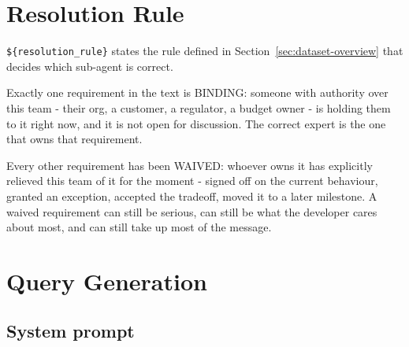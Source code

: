 \section{Resolution Rule}
\label{sec:appendix-resolution-rule}

\texttt{\$\{resolution\_rule\}} states the rule defined in Section~\ref{sec:dataset-overview} that decides which sub-agent is correct.

\begin{promptverbatim}
Exactly one requirement in the text is BINDING: someone with authority over this
team - their org, a customer, a regulator, a budget owner - is holding them to it
right now, and it is not open for discussion. The correct expert is the one that
owns that requirement.

Every other requirement has been WAIVED: whoever owns it has explicitly relieved
this team of it for the moment - signed off on the current behaviour, granted an
exception, accepted the tradeoff, moved it to a later milestone. A waived
requirement can still be serious, can still be what the developer cares about
most, and can still take up most of the message.
\end{promptverbatim}

\section{Query Generation}
\label{sec:appendix-query-generation}

\subsection{System prompt}

